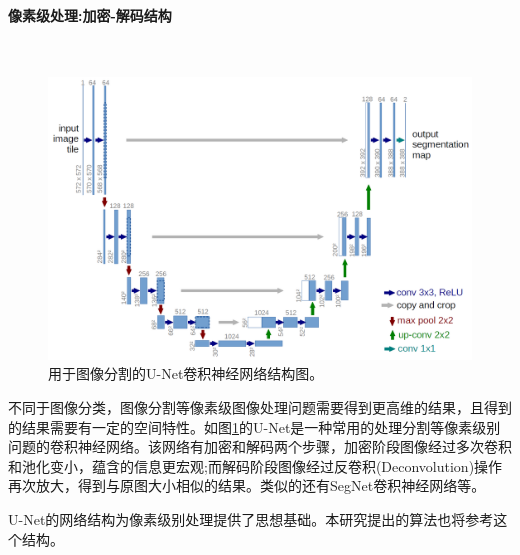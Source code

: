\paragraph{像素级处理:加密-解码结构}\ \par
\begin{figure}[htbp!]
    \centering
    \includegraphics[width = 1.\textwidth]{chap/img/u-net-architecture.png}
    \caption{
        用于图像分割的U-Net\supercite{ronneberger2015u}卷积神经网络结构图。
        }\label{fig:unet_architecture}
\end{figure}
\par
不同于图像分类，图像分割等像素级图像处理问题需要得到更高维的结果，且得到的结果需要有一定的空间特性。如图\ref{fig:unet_architecture}的U-Net是一种常用的处理分割等像素级别问题的卷积神经网络。该网络有加密和解码两个步骤，加密阶段图像经过多次卷积和池化变小，蕴含的信息更宏观;而解码阶段图像经过反卷积(Deconvolution)操作再次放大，得到与原图大小相似的结果。类似的还有SegNet\supercite{badrinarayanan2017segnet}卷积神经网络等。
\par
U-Net的网络结构为像素级别处理提供了思想基础。本研究提出的算法也将参考这个结构。
\par

